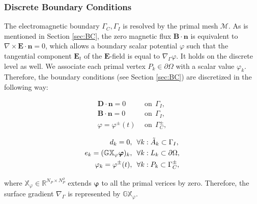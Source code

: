\documentclass{article}
\begin{document}
\subsubsection{Discrete Boundary Conditions}
The electromagnetic boundary $\Gamma_C, \Gamma_I$ is resolved by the primal mesh $\mathcal{M}$. As is mentioned in Section \ref{sec:BC}, the zero magnetic flux $\mathbf{B}\cdot \mathbf{n}$ is equivalent to $\nabla\times\mathbf{E} \cdot \mathbf{n} = 0$, which allows a boundary scalar potential $\varphi$ such that the tangential component $\mathbf{E}_t$ of the $\mathbf{E}$-field is equal to $\nabla_\Gamma\varphi$. It holds on the discrete level as well. We associate each primal vertex $P_k \in \partial\Omega$ with a scalar value $\varphi_k$. Therefore, the boundary conditions (see Section \ref{sec:BC}) are discretized in the following way:
\begin{center}
    \vspace{-0.5cm}
    \begin{minipage}{0.3\textwidth}
    \begin{align*}
    \mathbf{D} \cdot \mathbf{n} = 0\ \ &\text{on} \ \  \Gamma_I,  \\
    \mathbf{B} \cdot \mathbf{n} = 0\ \  &\text{on} \ \  \Gamma_I, \\
    \varphi = \varphi^\pm(t)\ \ &\text{on} \ \ \Gamma_C^\pm,
    \end{align*}
    \end{minipage}
    \begin{minipage}{0.1\textwidth}
    \centering
    \end{minipage}
    \begin{minipage}{0.5\textwidth}
        \centering
        \begin{subequations}
            \begin{align}
            d_k = 0,\ \ &\forall k : \Tilde{A}_k \subset \Gamma_I,\label{equ:bc_3} \\
            e_k = (\mathbb{GX}_\varphi\bm{\varphi})_k,\ \ &\forall k : L_k \subset \partial\Omega, \label{equ:bc_2}\\
            \varphi_k = \varphi^\pm(t), \ \ &\forall k : P_k \subset \Gamma_C^\pm, \label{equ:bc_1}
            \end{align}
        \end{subequations}
    \end{minipage}
\end{center}
where $\mathbb{X}_\varphi \in \mathbb{R}^{N_P \times N_P^\partial}$ extends $\bm{\varphi}$ to all the primal verices by zero. Therefore, the surface gradient $\nabla_\Gamma$ is represented by $\mathbb{GX}_\varphi$.
\end{document}
